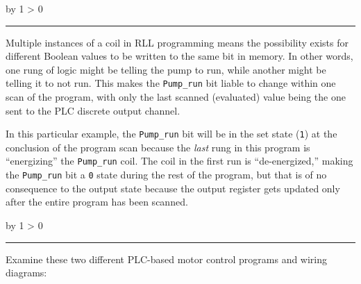 \documentclass[12pt,a4paper]{article}
\def\oppgave{
            \advance\questnum by 1
            \ifnum \questnum > 0
                 \hrule
                 \vskip 3pt
                 \leftline{Oppgave \the\questnum}
                 \vskip 3pt \fi}
\def\notes{
           \advance\explnum by 1
           \ifnum \explnum > 0
                \hrule
                \vskip 3pt
                \leftline{Notes \the\explnum}
                \vskip 3pt \fi}
\begin{document}
\notes{} 

Multiple instances of a coil in RLL programming means the possibility exists for different Boolean values to be written to the same bit in memory.  In other words, one rung of logic might be telling the pump to run, while another might be telling it to not run.  This makes the {\tt Pump\_run} bit liable to change within one scan of the program, with only the last scanned (evaluated) value being the one sent to the PLC discrete output channel.

\vskip 10pt

In this particular example, the {\tt Pump\_run} bit will be in the set state ({\tt 1}) at the conclusion of the program scan because the {\it last} rung in this program is ``energizing'' the {\tt Pump\_run} coil.  The coil in the first run is ``de-energized,'' making the {\tt Pump\_run} bit a {\tt 0} state during the rest of the program, but that is of no consequence to the output state because the output register gets updated only after the entire program has been scanned.


\vfil \eject 



\oppgave{} 

Examine these two different PLC-based motor control programs and wiring diagrams:
\end{document}
